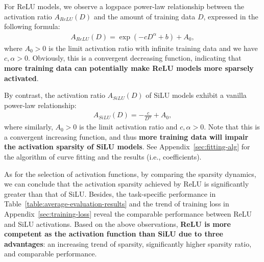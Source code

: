 \documentclass{article} %
\begin{document}
For ReLU models, we observe a logspace power-law relationship between the activation ratio $A_{ReLU}(D)$ and the amount of training data $D$, expressed in the following formula:
\begin{equation}
    \begin{aligned}
    \label{eq:relu-scaling}
    A_{ReLU}(D) = \exp(-c D^\alpha + b) + A_0,
    \end{aligned}
\end{equation}
where $A_0>0$ is the limit activation ratio with infinite training data and we have $c,\alpha>0$. Obviously, this is a convergent decreasing function, indicating that \textbf{more training data can potentially make ReLU models more sparsely activated}.

By contrast, the activation ratio $A_{SiLU}(D)$ of SiLU models exhibit a vanilla power-law relationship:
\begin{equation}
    \begin{aligned}
    \label{eq:silu-scaling}
    A_{SiLU}(D) = -\frac{c}{D^\alpha} + A_0,
    \end{aligned}
\end{equation}
where similarly, $A_0>0$ is the limit activation ratio and $c,\alpha>0$. Note that this is a convergent increasing function, and thus \textbf{more training data will impair the activation sparsity of SiLU models}. See Appendix~\ref{sec:fitting-alg} for the algorithm of curve fitting and the results (i.e., coefficients).

As for the selection of activation functions, by comparing the sparsity dynamics, we can conclude that the activation sparsity achieved by ReLU is significantly greater than that of SiLU. Besides, the task-specific performance in Table~\ref{table:average-evaluation-results} and the trend of training loss in Appendix~\ref{sec:training-loss} reveal the comparable performance between ReLU and SiLU activations. Based on the above observations, \textbf{ReLU is more competent as the activation function than SiLU due to three advantages}: an increasing trend of sparsity, significantly higher sparsity ratio, and comparable performance.

\end{document}
